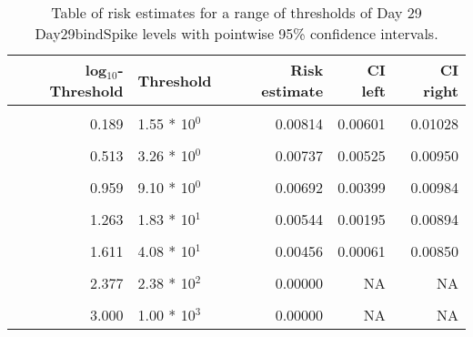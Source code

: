 \documentclass[]{article}
\begin{document}
\begin{table}[!h]

\caption{\label{tab:unnamed-chunk-17}Table of risk estimates for a range of thresholds of Day 29 Day29bindSpike levels with pointwise 95\% confidence intervals.}
\centering
\begin{tabular}[t]{rlrrr}
\toprule
log$_{10}$-Threshold & Threshold & Risk estimate & CI left & CI right\\
\midrule
\cellcolor{gray!6}{-0.813} & \cellcolor{gray!6}{1.54 * 10$^{1}$} & \cellcolor{gray!6}{0.00855} & \cellcolor{gray!6}{0.00654} & \cellcolor{gray!6}{0.01056}\\
0.189 & 1.55 * 10$^{0}$ & 0.00814 & 0.00601 & 0.01028\\
\cellcolor{gray!6}{0.341} & \cellcolor{gray!6}{2.19 * 10$^{0}$} & \cellcolor{gray!6}{0.00797} & \cellcolor{gray!6}{0.00584} & \cellcolor{gray!6}{0.01009}\\
0.513 & 3.26 * 10$^{0}$ & 0.00737 & 0.00525 & 0.00950\\
\cellcolor{gray!6}{0.792} & \cellcolor{gray!6}{6.19 * 10$^{0}$} & \cellcolor{gray!6}{0.00727} & \cellcolor{gray!6}{0.00487} & \cellcolor{gray!6}{0.00967}\\
0.959 & 9.10 * 10$^{0}$ & 0.00692 & 0.00399 & 0.00984\\
\cellcolor{gray!6}{1.113} & \cellcolor{gray!6}{1.30 * 10$^{1}$} & \cellcolor{gray!6}{0.00613} & \cellcolor{gray!6}{0.00277} & \cellcolor{gray!6}{0.00948}\\
1.263 & 1.83 * 10$^{1}$ & 0.00544 & 0.00195 & 0.00894\\
\cellcolor{gray!6}{1.491} & \cellcolor{gray!6}{3.10 * 10$^{1}$} & \cellcolor{gray!6}{0.00401} & \cellcolor{gray!6}{0.00054} & \cellcolor{gray!6}{0.00748}\\
1.611 & 4.08 * 10$^{1}$ & 0.00456 & 0.00061 & 0.00850\\
\cellcolor{gray!6}{1.729} & \cellcolor{gray!6}{5.36 * 10$^{1}$} & \cellcolor{gray!6}{0.00348} & \cellcolor{gray!6}{0.00039} & \cellcolor{gray!6}{0.00658}\\
2.377 & 2.38 * 10$^{2}$ & 0.00000 & NA & NA\\
\cellcolor{gray!6}{2.699} & \cellcolor{gray!6}{5.00 * 10$^{2}$} & \cellcolor{gray!6}{0.00000} & \cellcolor{gray!6}{NA} & \cellcolor{gray!6}{NA}\\
3.000 & 1.00 * 10$^{3}$ & 0.00000 & NA & NA\\
\bottomrule
\end{tabular}
\end{table}
\end{document}
